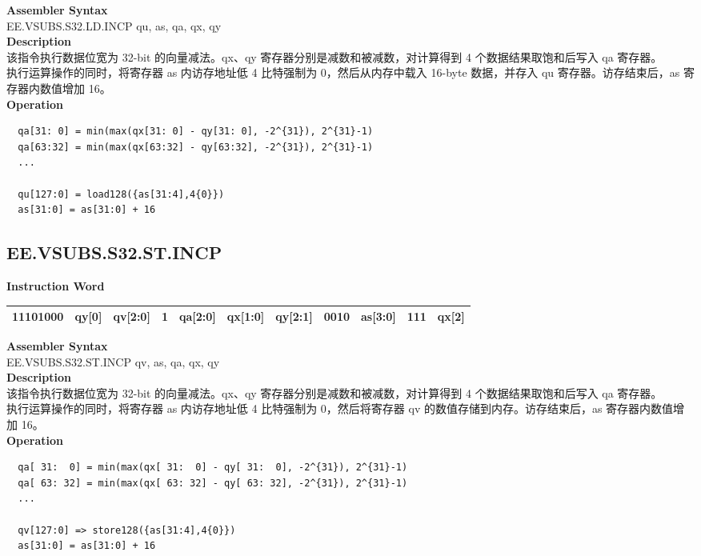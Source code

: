 \textbf{Assembler Syntax} \\
EE.VSUBS.S32.LD.INCP qu, as, qa, qx, qy \\
\textbf{Description} \\
该指令执行数据位宽为 32-bit 的向量减法。qx、qy 寄存器分别是减数和被减数，对计算得到 4 个数据结果取饱和后写入 qa 寄存器。\\ 执行运算操作的同时，将寄存器 as 内访存地址低 4 比特强制为 0，然后从内存中载入 16-byte 数据，并存入 qu 寄存器。访存结束后，as 寄存器内数值增加 16。\\
\textbf{Operation}
\begin{lstlisting}
  qa[31: 0] = min(max(qx[31: 0] - qy[31: 0], -2^{31}), 2^{31}-1)
  qa[63:32] = min(max(qx[63:32] - qy[63:32], -2^{31}), 2^{31}-1)
  ...

  qu[127:0] = load128({as[31:4],4{0}})
  as[31:0] = as[31:0] + 16
\end{lstlisting}

\clearpage
\subsection{EE.VSUBS.S32.ST.INCP}\label{instruction:EEVSUBSS32STINCP}
\setlength\tabcolsep{6pt}
\textbf{Instruction Word} \\
\begin{tabular}{|c|c|c|c|c|c|c|c|c|c|c|}
	\hline
	11101000 & qy[0] & qv[2:0] & 1 & qa[2:0] & qx[1:0] & qy[2:1] & 0010 & as[3:0] & 111 & qx[2] \\
	\hline
\end{tabular}

\textbf{Assembler Syntax} \\
EE.VSUBS.S32.ST.INCP qv, as, qa, qx, qy \\
\textbf{Description} \\
该指令执行数据位宽为 32-bit 的向量减法。qx、qy 寄存器分别是减数和被减数，对计算得到 4 个数据结果取饱和后写入 qa 寄存器。\\ 执行运算操作的同时，将寄存器 as 内访存地址低 4 比特强制为 0，然后将寄存器 qv 的数值存储到内存。访存结束后，as 寄存器内数值增加 16。\\
\textbf{Operation}
\begin{lstlisting}
  qa[ 31:  0] = min(max(qx[ 31:  0] - qy[ 31:  0], -2^{31}), 2^{31}-1)
  qa[ 63: 32] = min(max(qx[ 63: 32] - qy[ 63: 32], -2^{31}), 2^{31}-1)
  ...

  qv[127:0] => store128({as[31:4],4{0}})
  as[31:0] = as[31:0] + 16
\end{lstlisting}

